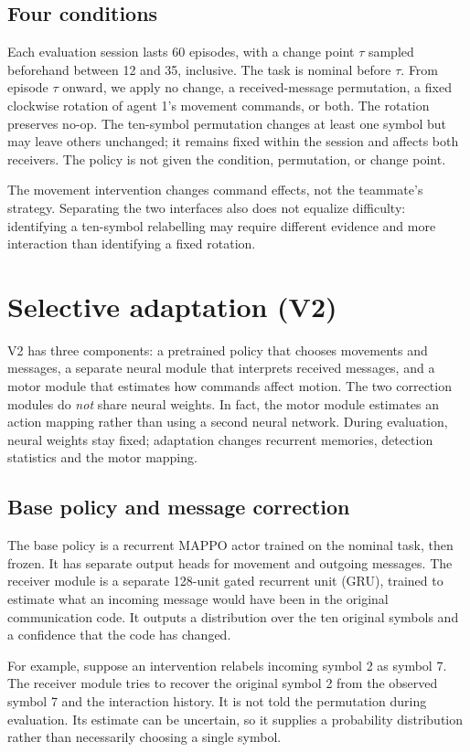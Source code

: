 \documentclass[10pt,a4paper]{article}
\begin{document}
\subsection{Four conditions}
Each evaluation session lasts 60 episodes, with a change point $\tau$ sampled beforehand between 12 and 35, inclusive. The task is nominal before $\tau$. From episode $\tau$ onward, we apply no change, a received-message permutation, a fixed clockwise rotation of agent 1's movement commands, or both. The rotation preserves no-op. The ten-symbol permutation changes at least one symbol but may leave others unchanged; it remains fixed within the session and affects both receivers. The policy is not given the condition, permutation, or change point.

The movement intervention changes command effects, not the teammate's strategy. Separating the two interfaces also does not equalize difficulty: identifying a ten-symbol relabelling may require different evidence and more interaction than identifying a fixed rotation.

\section{Selective adaptation (V2)}
V2 has three components: a pretrained policy that chooses movements and messages, a separate neural module that interprets received messages, and a motor module that estimates how commands affect motion. The two correction modules do \emph{not} share neural weights. In fact, the motor module estimates an action mapping rather than using a second neural network. During evaluation, neural weights stay fixed; adaptation changes recurrent memories, detection statistics and the motor mapping.

\subsection{Base policy and message correction}
The base policy is a recurrent MAPPO actor trained on the nominal task, then frozen. It has separate output heads for movement and outgoing messages. The receiver module is a separate 128-unit gated recurrent unit (GRU), trained to estimate what an incoming message would have been in the original communication code. It outputs a distribution over the ten original symbols and a confidence that the code has changed.

For example, suppose an intervention relabels incoming symbol 2 as symbol 7. The receiver module tries to recover the original symbol 2 from the observed symbol 7 and the interaction history. It is not told the permutation during evaluation. Its estimate can be uncertain, so it supplies a probability distribution rather than necessarily choosing a single symbol.
\end{document}
